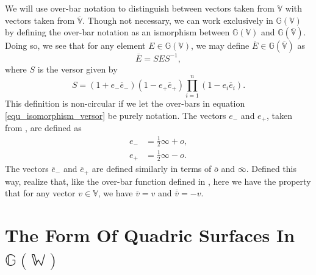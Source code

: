 \documentclass{birkjour}
\theoremstyle{definition}
\theoremstyle{remark}
\numberwithin{equation}{section}
\newcommand{\G}{\mathbb{G}}
\newcommand{\V}{\mathbb{V}}
\newcommand{\Vb}{\mathbb{\overline{V}}}
\newcommand{\W}{\mathbb{W}}
\newcommand{\nvao}{o}
\newcommand{\nvai}{\infty}
\newcommand{\nvaob}{\overline{o}}
\newcommand{\nvaib}{\overline{\infty}}
\newcommand{\eminus}{e_{-}}
\newcommand{\eplus}{e_{+}}
\newcommand{\eminusb}{\overline{e}_{-}}
\newcommand{\eplusb}{\overline{e}_{+}}
\begin{document}
We will use over-bar notation to distinguish between vectors taken from $\V$
with vectors taken from $\Vb$.  Though not necessary, we can work exclusively
in $\G(\V)$ by defining the over-bar notation as an ismorphism between
$\G(\V)$ and $\G(\Vb)$.  Doing so, we see that for any element $E\in\G(\V)$,
we may define $\overline{E}\in\G(\Vb)$ as
\begin{equation}
\overline{E} = SES^{-1},
\end{equation}
where $S$ is the versor given by
\begin{equation}\label{equ_isomorphism_versor}
S = (1+\eminus\eminusb)(1-\eplus\eplusb)\prod_{i=1}^n(1-e_i\overline{e}_i).
\end{equation}
This definition is non-circular if we let the over-bars in equation \eqref{equ_isomorphism_versor}
be purely notation.  The vectors $\eminus$ and $\eplus$, taken from \cite{LiRockwood},
are defined as
\begin{align}
\eminus &= \frac{1}{2}\nvai + \nvao, \\
\eplus &= \frac{1}{2}\nvai - \nvao.
\end{align}
The vectors $\eminusb$ and $\eplusb$ are defined similarly in terms of $\nvaob$ and $\nvaib$.
Defined this way, realize that, like the over-bar function defined in \cite{Parkin12},
here we have the property that for any vector $v\in\V$, we have $\overline{v}=v$ and $\overline{\overline{v}}=-v$.

\section{The Form Of Quadric Surfaces In $\G(\W)$}
\end{document}
